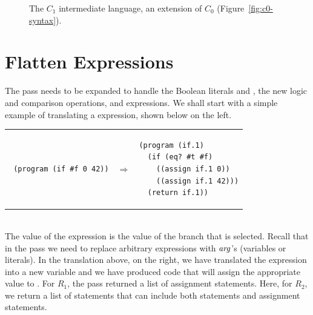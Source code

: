 \documentclass[11pt]{book}
\newcommand{\gray}[1]{{\color{lightgray} #1}}
\begin{document}
\begin{figure}[tbp]
\fbox{
\begin{minipage}{0.96\textwidth}
\[
\begin{array}{lcl}
\Arg &::=& \gray{\Int \mid \Var} \mid \key{\#t} \mid \key{\#f} \\
\Exp &::= & \gray{\Arg \mid (\key{read}) \mid (\key{-}\;\Arg) \mid (\key{+} \; \Arg\;\Arg)}
      \mid (\key{not}\;\Arg) \mid (\key{eq?}\;\Arg\;\Arg) \\
\Stmt &::=& \gray{\ASSIGN{\Var}{\Exp} \mid \RETURN{\Arg}} \\
      &\mid& \IF{(\key{eq?}\, \Arg\,\Arg)}{\Stmt^{*}}{\Stmt^{*}} \\
C_1 & ::= & (\key{program}\;(\Var^{*})\;\Stmt^{+})
\end{array}
\]
\end{minipage}
}
\caption{The $C_1$ intermediate language, an extension of $C_0$
  (Figure~\ref{fig:c0-syntax}).}
\label{fig:c1-syntax}
\end{figure}

\section{Flatten Expressions}
\label{sec:flatten-r2}

The  pass needs to be expanded to handle the Boolean
literals  and , the new logic and comparison
operations, and  expressions. We shall start with a simple
example of translating a  expression, shown below on the
left. \\
\begin{tabular}{lll}
\begin{minipage}{0.4\textwidth}
\begin{lstlisting}
 (program (if #f 0 42))
\end{lstlisting}
\end{minipage}
&
$\Rightarrow$
&
\begin{minipage}{0.4\textwidth}
\begin{lstlisting}
(program (if.1)
  (if (eq? #t #f)
    ((assign if.1 0))
    ((assign if.1 42)))
  (return if.1))
\end{lstlisting}
\end{minipage}
\end{tabular} \\
The value of the  expression is the value of the branch that
is selected. Recall that in the  pass we need to replace
arbitrary expressions with $\mathit{arg}$'s (variables or literals). In the
translation above, on the right, we have translated the 
expression into a new variable  and we have produced code
that will assign the appropriate value to .  For $R_1$, the
 pass returned a list of assignment statements. Here,
for $R_2$, we return a list of statements that can include both
 statements and assignment statements.
\end{document}
